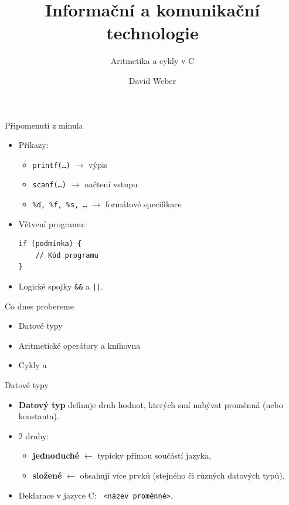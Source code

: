 \documentclass[14pt,aspectratio=169]{beamer}
\title{Informační a komunikační technologie}
\subtitle{Aritmetika a cykly v C}
\author{David Weber}
\begin{document}

    \begin{frame}
        \titlepage
    \end{frame}

    \begin{frame}[t,fragile]{Připomenutí z minula}
        \begin{itemize}
            \item Příkazy:
            \begin{itemize}
                \item \texttt{printf(\dots)} $\rightarrow$ výpis
                \item \texttt{scanf(\dots)} $\rightarrow$ načtení vstupu
                \item \texttt{\%d, \%f, \%s, \dots} $\rightarrow$ formátové specifikace
            \end{itemize}
            \item Větvení programu:
            \begin{lstlisting}
if (podmínka) {
    // Kód programu
}
            \end{lstlisting}
            \item Logické spojky \texttt{\&\&} a \texttt{||}.
        \end{itemize}
    \end{frame}

    \begin{frame}[t]{Co dnes probereme}
        \begin{itemize}
            \item Datové typy
            \item Aritmetické operátory a knihovna 
            \item Cykly  a 
        \end{itemize}
    \end{frame}

    \begin{frame}[t]{Datové typy}
        \begin{itemize}
            \item \textbf{Datový typ} definuje druh hodnot, kterých smí nabývat proměnná (nebo konstanta).
            \item 2 druhy:
            \begin{itemize}
                \item \textbf{jednoduché} $\leftarrow$ typicky přímou součástí jazyka,
                \item \textbf{složené} $\leftarrow$ obsahují více prvků (stejného či různých datových typů).
            \end{itemize}
            \item Deklarace v jazyce C: \texttt{ <název proměnné>}.
        \end{itemize}
    \end{frame}
\end{document}
